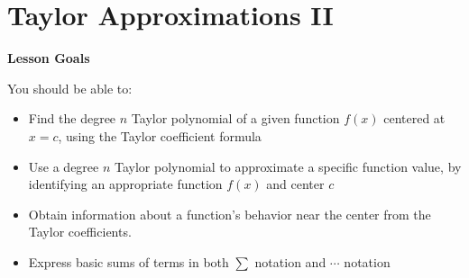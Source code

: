 \documentclass[main]{subfiles}
\begin{document}
\ifSubfilesClassLoaded{%
  \chaptermark{\chaptertwo}
}{}

\section{Taylor Approximations II} \label{ws2-2}

\begin{framed}
\centerline{\textbf{Lesson Goals}}

You should be able to:
\begin{itemize}
\item Find the degree $n$ Taylor polynomial of a given function $f(x)$ centered at $x=c$, using the Taylor coefficient formula
\item Use a degree $n$ Taylor polynomial to approximate a specific function value, by identifying an appropriate function $f(x)$ and center $c$
\item Obtain information about a function's behavior near the center from the Taylor coefficients.
\item Express basic sums of terms in both $\sum$ notation and $\cdots$ notation
\end{itemize}
\end{framed}
\end{document}
